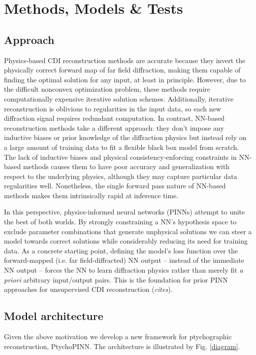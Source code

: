 \documentclass[sn-mathphys]{sn-jnl}%
\theoremstyle{thmstyleone}%
\theoremstyle{thmstyletwo}%
\theoremstyle{thmstylethree}%
\begin{document}
\section{Methods, Models \& Tests}
\subsection{Approach}

Physics-based CDI reconstruction methods are accurate because they invert the physically correct forward map of far field diffraction, making them capable of finding the optimal solution for any input, at least in principle. However, due to the difficult nonconvex optimization problem, these methods require computationally expensive iterative solution schemes. Additionally, iterative reconstruction is oblivious to regularities in the input data, so each new diffraction signal requires redundant computation. In contrast, NN-based reconstruction methods take a different approach: they don't impose any inductive biases or prior knowledge of the diffraction physics but instead rely on a large amount of training data to fit a flexible black box model from scratch. The lack of inductive biases and physical consistency-enforcing constraints in NN-based methods causes them to have poor accuracy and generalization with respect to the underlying physics, although they may capture particular data regularities well. Nonetheless, the single forward pass nature of NN-based methods makes them intrinsically rapid at inference time.

In this perspective, physics-informed neural networks (PINNs) attempt to unite the best of both worlds. By strongly constraining a NN's hypothesis space to exclude parameter combinations that generate unphysical solutions we can steer a model towards correct solutions while considerably reducing its need for training data. As a concrete starting point, defining the model's loss function over the forward-mapped (i.e. far field-diffracted) NN output -- instead of the immediate NN output -- forces the NN to learn diffraction physics rather than merely fit \emph{a priori} arbitrary input/output pairs. This is the foundation for prior PINN approaches for unsupervised CDI reconstruction (\emph{cites}).

\subsection{Model architecture}
Given the above motivation we develop a new framework for ptychographic reconstruction, PtychoPINN. The architecture is illustrated by Fig. \ref{diagram}.
\end{document}
